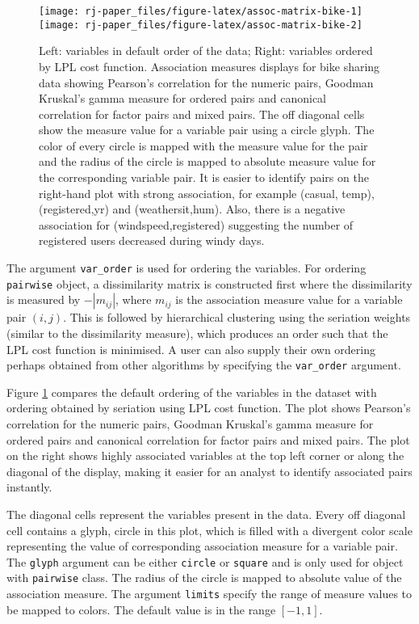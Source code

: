 \begin{figure}
\texttt{[image: rj-paper\_files/figure-latex/assoc-matrix-bike-1]} \texttt{[image: rj-paper\_files/figure-latex/assoc-matrix-bike-2]} \caption{Left: variables in default order of the data; Right: variables ordered by LPL cost function. Association measures displays for bike sharing data showing Pearson's correlation for the numeric pairs, Goodman Kruskal's gamma measure for ordered pairs and canonical correlation for factor pairs and mixed pairs. The off diagonal cells show the measure value for a variable pair using a circle glyph. The color of every circle is mapped with the measure value for the pair and the radius of the circle is mapped to absolute measure value for the corresponding variable pair. It is easier to identify pairs on the right-hand plot with strong association, for example (casual, temp), (registered,yr) and (weathersit,hum). Also, there is a negative association for (windspeed,registered) suggesting the number of registered users decreased during windy days.}\label{fig:assoc-matrix-bike}
\end{figure}

The argument \texttt{var\_order} is used for ordering the variables. For ordering \texttt{pairwise} object, a dissimilarity matrix is constructed first where the dissimilarity is measured by \(-|m_{ij}|\), where \(m_{ij}\) is the association measure value for a variable pair \((i,j)\). This is followed by hierarchical clustering using the seriation weights (similar to the dissimilarity measure), which produces an order such that the LPL cost function is minimised. A user can also supply their own ordering perhaps obtained from other algorithms by specifying the \texttt{var\_order} argument.

Figure \ref{fig:assoc-matrix-bike} compares the default ordering of the variables in the dataset with ordering obtained by seriation using LPL cost function. The plot shows Pearson's correlation for the numeric pairs, Goodman Kruskal's gamma measure for ordered pairs and canonical correlation for factor pairs and mixed pairs. The plot on the right shows highly associated variables at the top left corner or along the diagonal of the display, making it easier for an analyst to identify associated pairs instantly.

The diagonal cells represent the variables present in the data. Every off diagonal cell contains a glyph, circle in this plot, which is filled with a divergent color scale representing the value of corresponding association measure for a variable pair. The \texttt{glyph} argument can be either \texttt{circle} or \texttt{square} and is only used for object with \texttt{pairwise} class. The radius of the circle is mapped to absolute value of the association measure. The argument \texttt{limits} specify the range of measure values to be mapped to colors. The default value is in the range \([-1,1]\).

